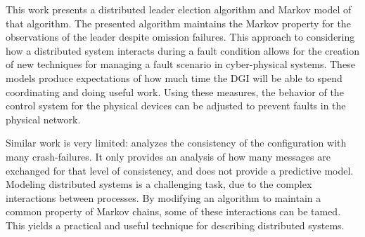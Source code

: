 This work presents a distributed leader election algorithm and Markov model of that algorithm.
The presented algorithm maintains the Markov property for the observations of the leader despite omission\cite{OMISSIONFAILURES} failures.
This approach to considering how a distributed system interacts during a fault condition allows for the creation of new techniques for managing a fault scenario in cyber-physical systems.
These models produce expectations of how much time the DGI will be able to spend coordinating and doing useful work.
Using these measures, the behavior of the control system for the physical devices can be adjusted to prevent faults in the physical network.

Similar work is very limited: \cite{LEADERELECTIONEVAL} analyzes the consistency of the configuration with many crash-failures.
It only provides an analysis of how many messages are exchanged for that level of consistency, and does not provide a predictive model.
Modeling distributed systems is a challenging task, due to the complex interactions between processes.
By modifying an algorithm to maintain a common property of Markov chains, some of these interactions can be tamed.
This yields a practical and useful technique for describing distributed systems.
